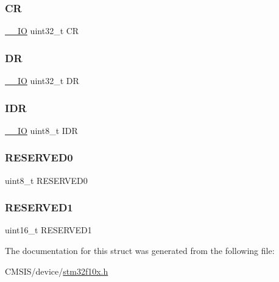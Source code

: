 \subsubsection{\texorpdfstring{CR}{CR}}
{\footnotesize\ttfamily \mbox{\hyperlink{core__sc300_8h_aec43007d9998a0a0e01faede4133d6be}{\+\_\+\+\_\+\+IO}} uint32\+\_\+t CR}

\mbox{\label{struct_c_r_c___type_def_a3df0d8dfcd1ec958659ffe21eb64fa94}} 
\subsubsection{\texorpdfstring{DR}{DR}}
{\footnotesize\ttfamily \mbox{\hyperlink{core__sc300_8h_aec43007d9998a0a0e01faede4133d6be}{\+\_\+\+\_\+\+IO}} uint32\+\_\+t DR}

\mbox{\label{struct_c_r_c___type_def_a601d7b0ba761c987db359b2d7173b7e0}} 
\subsubsection{\texorpdfstring{IDR}{IDR}}
{\footnotesize\ttfamily \mbox{\hyperlink{core__sc300_8h_aec43007d9998a0a0e01faede4133d6be}{\+\_\+\+\_\+\+IO}} uint8\+\_\+t I\+DR}

\mbox{\label{struct_c_r_c___type_def_aa7d2bd5481ee985778c410a7e5826b71}} 
\subsubsection{\texorpdfstring{RESERVED0}{RESERVED0}}
{\footnotesize\ttfamily uint8\+\_\+t R\+E\+S\+E\+R\+V\+E\+D0}

\mbox{\label{struct_c_r_c___type_def_a8249a3955aace28d92109b391311eb30}} 
\subsubsection{\texorpdfstring{RESERVED1}{RESERVED1}}
{\footnotesize\ttfamily uint16\+\_\+t R\+E\+S\+E\+R\+V\+E\+D1}



The documentation for this struct was generated from the following file\+:\begin{DoxyCompactItemize}
\item 
C\+M\+S\+I\+S/device/\mbox{\hyperlink{stm32f10x_8h}{stm32f10x.\+h}}\end{DoxyCompactItemize}
